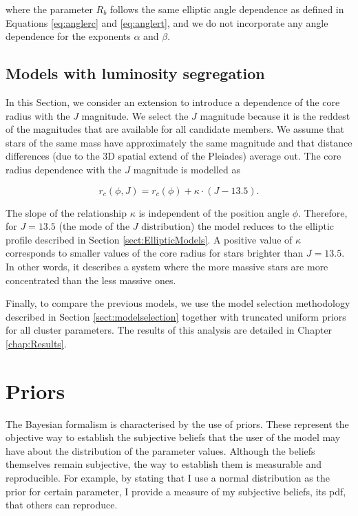 where the parameter $R_b$ follows the same elliptic angle dependence as defined in Equations \ref{eq:anglerc} and \ref{eq:anglert}, and we do not incorporate any angle dependence for the exponents $\alpha$ and $\beta$.

\subsection{Models with luminosity segregation}
\label{sect:SegregatedModels}
In this Section, we consider an extension to introduce a dependence of the core radius with the $J$ magnitude. We select the $J$ magnitude because it is the reddest of the magnitudes that are available for all candidate members. We assume that stars of the same mass have approximately the same magnitude and that distance differences (due to the 3D spatial extend of the Pleiades) average out. The core radius dependence with the $J$ magnitude is modelled as

\begin{equation}
  r_c(\phi,J) = r_c(\phi)+\kappa\cdot(J-13.5).
\end{equation}

The slope of the relationship $\kappa$ is independent of the position angle $\phi$. Therefore, for $J=13.5$ (the mode of the $J$ distribution) the model reduces to the elliptic profile described in Section \ref{sect:EllipticModels}. A positive value of $\kappa$ corresponds to smaller values of the core radius for stars brighter than $J=13.5$. In other words, it describes a system where the more massive stars are more concentrated than the less massive ones.

Finally, to compare the previous models, we use the model selection methodology described in Section \ref{sect:modelselection} together with truncated uniform priors for all cluster parameters. The results of this analysis are detailed in Chapter \ref{chap:Results}.

\section{Priors}
\label{sect:priors}
The Bayesian formalism is characterised by the use of priors. These represent the objective way to establish the subjective beliefs that the user of the model may have about the distribution of the parameter values. Although the beliefs themselves remain subjective, the way to establish them is measurable and reproducible. For example, by stating that I use a normal distribution as the prior for certain parameter, I provide a measure of my subjective beliefs, its \gls{pdf}, that others can reproduce.

